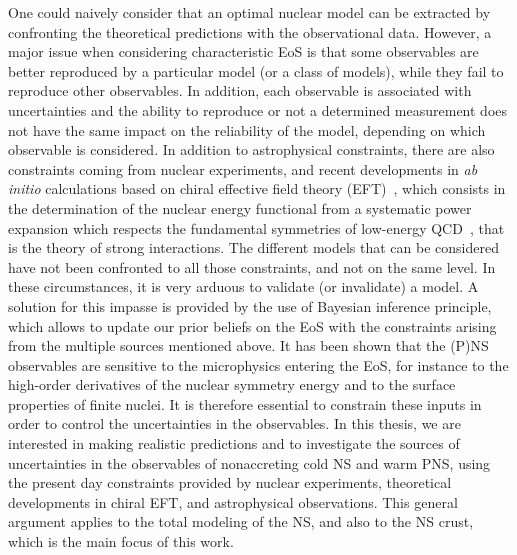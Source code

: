 One could naively consider that an optimal nuclear model can be extracted by 
confronting the theoretical predictions with the observational data. However, 
a major issue when considering characteristic EoS is that some
observables are better reproduced by a particular model (or a class of 
models), while they fail to reproduce other observables. In addition, each
observable is associated with uncertainties and the ability to reproduce or not 
a determined measurement does not have the same impact on the reliability of
the model, depending on which observable is considered.
In addition to astrophysical constraints, there are also constraints coming
from nuclear experiments, and recent developments in \textit{ab initio} 
calculations based on chiral effective field theory (EFT)~\cite{Drischler2016}, 
which consists in the determination of the nuclear energy functional from a
systematic power expansion which respects the fundamental symmetries of
low-energy QCD~\cite{Machleidt2011}, that is the theory of strong interactions. 
The different models that can be considered have not been confronted to all 
those constraints, and not on the same level. In these circumstances, it is 
very arduous to validate (or invalidate) a model. A solution for this impasse 
is provided by the use of Bayesian inference principle, which allows to update 
our prior beliefs on the EoS with the constraints arising from the multiple 
sources mentioned above.
%
It has been shown that the (P)NS observables are sensitive to the 
microphysics entering the EoS, for instance to the high-order derivatives of 
the nuclear symmetry energy and to the surface properties of finite nuclei. 
It is therefore essential to constrain these inputs in order to control the 
uncertainties in the observables.
In this thesis, we are interested in making realistic predictions and to
investigate the sources of uncertainties in the observables of nonaccreting
cold NS and warm PNS, using the present day constraints provided by nuclear
experiments, theoretical developments in chiral EFT, and astrophysical 
observations. This general argument applies to the total modeling of the 
NS, and also to the NS crust, which is the main focus of this work. 

